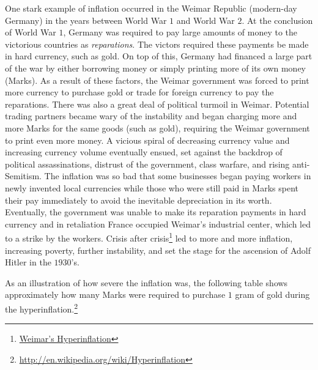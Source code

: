 \documentclass{ximera}
\begin{document}
One stark example of inflation occurred in the Weimar Republic (modern-day Germany) in the years between World War $1$ and World War $2$. At the conclusion of World War $1$, Germany was required to pay large amounts of money to the victorious countries as \emph{reparations}. The victors required these payments be made in hard currency, such as gold. On top of this, Germany had financed a large part of the war by either borrowing money or simply printing more of its own money (Marks). As a result of these factors, the Weimar government was forced to print more currency to purchase gold or trade for foreign currency to pay the reparations. There was also a great deal of political turmoil in Weimar. Potential trading partners became wary of the instability and began charging more and more Marks for the same goods (such as gold), requiring the Weimar government to print even more money. A vicious spiral of decreasing currency value and increasing currency volume eventually ensued, set against the backdrop of political assassinations, distrust of the government, class warfare, and rising anti-Semitism. The inflation was so bad that some businesses began paying workers in newly invented local currencies while those who were still paid in Marks spent their pay immediately to avoid the inevitable depreciation in its worth. Eventually, the government was unable to make its reparation payments in hard currency and in retaliation France occupied Weimar's industrial center, which led to a strike by the workers. Crisis after crisis\footnote{\href{http://www.businessinsider.com/weimar-the-real-story-of-the-devastating-collapse-that-haunts-the-eurozone-today-2012-10?op=1}{Weimar's Hyperinflation}} led to more and more inflation, increasing poverty, further instability, and set the stage for the ascension of Adolf Hitler in the $1930$'s.

As an illustration of how severe the inflation was, the following table shows approximately how many Marks were required to purchase $1$ gram of gold during the hyperinflation.\footnote{\href{http://en.wikipedia.org/wiki/Hyperinflation}{http://en.wikipedia.org/wiki/Hyperinflation}}
\end{document}
